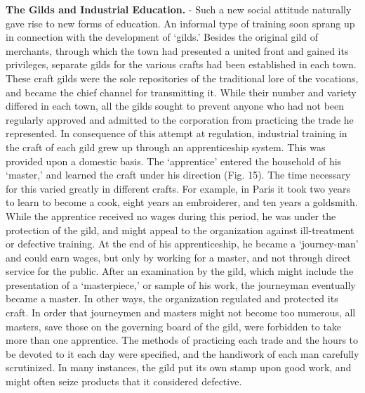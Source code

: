 \documentclass[
]{book}
\begin{document}
\textbf{The Gilds and Industrial Education.} - Such a new social attitude naturally gave rise to new forms of education. An informal type of training soon sprang up in connection with the development of `gilds.' Besides the original gild of merchants, through which the town had presented a united front and gained its privileges, separate gilds for the various crafts had been established in each town. These craft gilds were the sole repositories of the traditional lore of the vocations, and became the chief channel for transmitting it. While their number and variety differed in each town, all the gilds sought to prevent anyone who had not been regularly approved and admitted to the corporation from practicing the trade he represented. In consequence of this attempt at regulation, industrial training in the craft of each gild grew up through an apprenticeship system. This was provided upon a domestic basis. The `apprentice' entered the household of his `master,' and learned the craft under his direction (Fig. 15). The time necessary for this varied greatly in different crafts. For example, in Paris it took two years to learn to become a cook, eight years an embroiderer, and ten years a goldsmith. While the apprentice received no wages during this period, he was under the protection of the gild, and might appeal to the organization against ill-treatment or defective training. At the end of his apprenticeship, he became a `journey-man' and could earn wages, but only by working for a master, and not through direct service for the public. After an examination by the gild, which might include the presentation of a `masterpiece,' or sample of his work, the journeyman eventually became a master. In other ways, the organization regulated and protected its craft. In order that journeymen and masters might not become too numerous, all masters, save those on the governing board of the gild, were forbidden to take more than one apprentice. The methods of practicing each trade and the hours to be devoted to it each day were specified, and the handiwork of each man carefully scrutinized. In many instances, the gild put its own stamp upon good work, and might often seize products that it considered defective.
\end{document}
